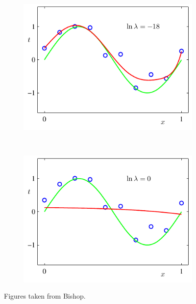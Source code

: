 \begin{figure}
	\centering
	\begin{subfigure}[b]{0.45\textwidth}
                \centering
                \includegraphics[width=\textwidth]{./lecture1/Figure1_7a}
    \end{subfigure}%
	~
	\begin{subfigure}[b]{0.45\textwidth}
                \centering
                \includegraphics[width=\textwidth]{./lecture1/Figure1_7b}
    \end{subfigure}%
	\caption{Figures taken from Bishop.}
\end{figure}

